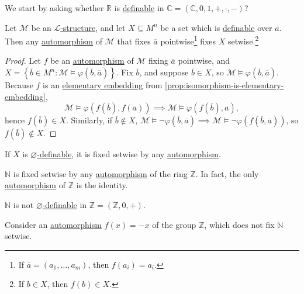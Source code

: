We start by asking whether \(\mathbb{R} \) is \hyperref[def:definable]{definable} in \(\mathbb{C} = (\mathbb{C} , 0, 1, +, \cdot, -)\)?

\begin{proposition}
	Let \(\mathcal{M} \) be an \hyperref[def:structure]{\(\mathcal{L} \)-structure}, and let \(X \subseteq M^n\) be a set which is \hyperref[def:definable]{definable} over \(\overline{a} \). Then any \hyperref[def:automorphism]{automorphism} of \(\mathcal{M} \) that fixes \(\overline{a} \) pointwise\footnote{If \(\overline{a} =(a_1, \dots , a_m)\), then \(f(a_i) = a_i\).} fixes \(X\) setwise.\footnote{If \(b\in X\), then \(f(b)\in X\).}
\end{proposition}
\begin{proof}
	Let \(f\) be an \hyperref[def:automorphism]{automorphism} of \(\mathcal{M} \) fixing \(\overline{a} \) pointwise, and \(X = \left\{ \overline{b} \in M^n\colon \mathcal{M} \models \varphi (\overline{b}, \overline{a} ) \right\} \). Fix \(\overline{b} \), and suppose \(\overline{b} \in X\), so \(\mathcal{M} \models \varphi (\overline{b} , \overline{a} )\). Because \(f\) is an \hyperref[def:elementary-embedding]{elementary embedding} from \autoref{prop:isomorphism-is-elementary-embedding},
	\[
		\mathcal{M} \models \varphi (f(\overline{b} ), f(\overline{a} ))
		\implies \mathcal{M} \models \varphi (f(\overline{b} ), \overline{a} ),
	\]
	hence \(f(\overline{b} )\in X\). Similarly, if \(\overline{b} \notin X\), \(\mathcal{M} \models \lnot \varphi (\overline{b} , \overline{a} ) \implies \mathcal{M} \models \lnot \varphi (f(\overline{b} , \overline{a} ))\), so \(f(\overline{b} ) \notin X\).
\end{proof}

\begin{remark}
	If \(X\) is \hyperref[def:definable]{\(\varnothing \)-definable}, it is fixed setwise by any \hyperref[def:automorphism]{automorphism}.
\end{remark}

\begin{eg}
	\(\mathbb{N} \) is fixed setwise by any \hyperref[def:automorphism]{automorphism} of the ring \(\mathbb{Z} \). In fact, the only \hyperref[def:automorphism]{automorphism} of \(\mathbb{Z} \) is the identity.
\end{eg}

\begin{eg}
	\(\mathbb{N} \) is not \hyperref[def:definable]{\(\varnothing \)-definable} in \(\mathbb{Z} =(\mathbb{Z} , 0, +)\).
\end{eg}
\begin{explanation}
	Consider an \hyperref[def:automorphism]{automorphism} \(f(x) = -x\) of the group \(\mathbb{Z} \), which does not fix \(\mathbb{N} \) setwise.
\end{explanation}

